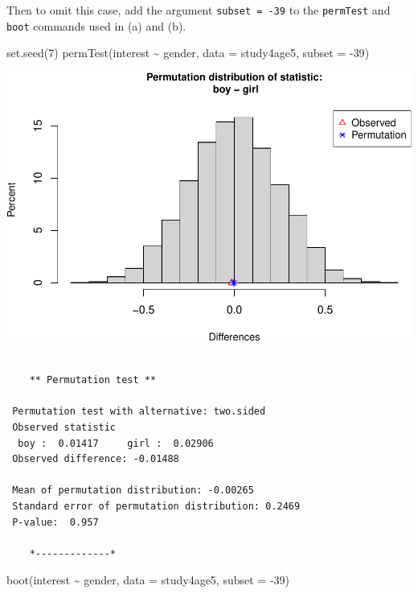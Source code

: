 \documentclass[
]{book}
\newenvironment{Shaded}{\begin{snugshade}}{\end{snugshade}}
\newcommand{\AttributeTok}[1]{\textcolor[rgb]{0.77,0.63,0.00}{#1}}
\newcommand{\DecValTok}[1]{\textcolor[rgb]{0.00,0.00,0.81}{#1}}
\newcommand{\FunctionTok}[1]{\textcolor[rgb]{0.00,0.00,0.00}{#1}}
\newcommand{\NormalTok}[1]{#1}
\newcommand{\SpecialCharTok}[1]{\textcolor[rgb]{0.00,0.00,0.00}{#1}}
\begin{document}
Then to omit this case, add the argument \texttt{subset\ =\ -39} to the \texttt{permTest} and \texttt{boot} commands used in (a) and (b).

\begin{Shaded}
\begin{Highlighting}[]
\FunctionTok{set.seed}\NormalTok{(}\DecValTok{7}\NormalTok{)}
\FunctionTok{permTest}\NormalTok{(interest }\SpecialCharTok{\textasciitilde{}}\NormalTok{ gender, }\AttributeTok{data =}\NormalTok{ study4age5, }\AttributeTok{subset =} \SpecialCharTok{{-}}\DecValTok{39}\NormalTok{)}
\end{Highlighting}
\end{Shaded}

\includegraphics[width=1\linewidth]{Class_Activity_14_files/figure-latex/unnamed-chunk-11-1}

\begin{verbatim}

    ** Permutation test **

 Permutation test with alternative: two.sided 
 Observed statistic
  boy :  0.01417     girl :  0.02906 
 Observed difference: -0.01488 

 Mean of permutation distribution: -0.00265 
 Standard error of permutation distribution: 0.2469 
 P-value:  0.957 

    *-------------*
\end{verbatim}

\begin{Shaded}
\begin{Highlighting}[]
\FunctionTok{boot}\NormalTok{(interest }\SpecialCharTok{\textasciitilde{}}\NormalTok{ gender, }\AttributeTok{data =}\NormalTok{ study4age5, }\AttributeTok{subset =} \SpecialCharTok{{-}}\DecValTok{39}\NormalTok{)}
\end{Highlighting}
\end{Shaded}
\end{document}
